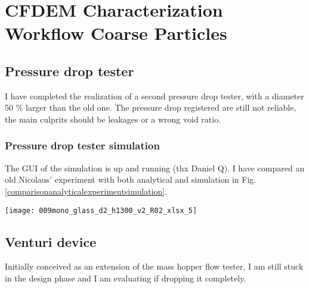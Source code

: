 
\section{CFDEM Characterization Workflow Coarse Particles}
\label{section:CFDemcharacterizationworkflowcoarseparticles}

\subsection{Pressure drop tester}
\label{subsection:pressuredroptester}

I have completed the realization of a second pressure drop tester, with a diameter 50 \% larger than the old one.
The pressure drop registered are still not reliable, the main culprits should be leakages or a wrong void ratio.\\

\subsubsection{Pressure drop tester simulation}
\label{subsubsection:pressuredroptestersimulation}

The GUI of the simulation is up and running (thx Daniel Q).
I have compared an old Nicolaus' experiment with both analytical and simulation in Fig. \ref{comparisonanalyticalexperimentsimulation}. \\

\begin{sidewaysfigure}
\texttt{[image: 009mono\_glass\_d2\_h1300\_v2\_R02\_xlsx\_5]}
\caption{mono glass d2 h1300 v2 R02 xlsx 5}
\label{comparisonanalyticalexperimentsimulation}
\end{sidewaysfigure}

\subsection{Venturi device}
\label{subsection:venturidevice}

Initially conceived as an extension of the mass hopper flow tester, I am still stuck in the design phase and I am evaluating if dropping it completely.\\